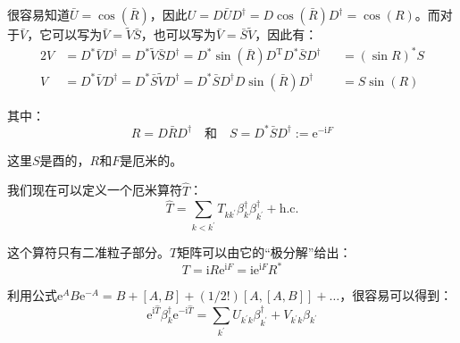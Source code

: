 \begin{booknote*}
很容易知道$\bar{U}=\cos(\bar{R})$，因此$U=D\bar{U}D^{\dagger}=D\cos(\bar{R})D^{\dagger}=\cos(R)$。而对于$\bar{V}$，它可以写为$\bar{V}=\tilde{V}\bar{S}$，也可以写为$\bar{V}=\bar{S}\tilde{V}$，因此有：
\begin{alignat*}{2}
V & =D^{*}\bar{V}D^{\dagger}=D^{*}\tilde{V}\bar{S}D^{\dagger}=D^{*}\sin(\bar{R})D^{\mathrm{T}}D^{*}\bar{S}D^{\dagger} &  & =(\sin R)^{*}S\\
V & =D^{*}\bar{V}D^{\dagger}=D^{*}\bar{S}\tilde{V}D^{\dagger}=D^{*}\bar{S}D^{\dagger}D\sin(\bar{R})D^{\dagger} &  & =S\sin(R)
\end{alignat*}
\end{booknote*}
其中：
\[
R=D\bar{R}D^{\dagger}\quad\text{和}\quad S=D^{*}\bar{S}D^{\dagger}:=\mathrm{e}^{-\mathrm{i}F}
\]

这里$S$是酉的，$R$和$F$是厄米的。

我们现在可以定义一个厄米算符$\hat{T}$：
\[
\hat{T}=\sum_{k<k^{\prime}}T_{kk^{\prime}}\beta^{\dagger}_{k}\beta^{\dagger}_{k^{\prime}}+\text{h.c.}
\]

这个算符只有二准粒子部分。$T$矩阵可以由它的“极分解”给出：
\[
T=\mathrm{i}R\mathrm{e}^{\mathrm{i}F}=\mathrm{i}\mathrm{e}^{\mathrm{i}F}R^{*}
\]

利用公式$\mathrm{e}^{A}B\mathrm{e}^{-A}=B+[A,B]+(1/2!)[A,[A,B]]+\dots$，很容易可以得到：
\[
\mathrm{e}^{\mathrm{i}\hat{T}}\beta^{\dagger}_{k}\mathrm{e}^{-\mathrm{i}\hat{T}}=\sum_{k^{\prime}}U_{k^{\prime}k}\beta^{\dagger}_{k^{\prime}}+V_{k^{\prime}k}\beta_{k^{\prime}}
\]

